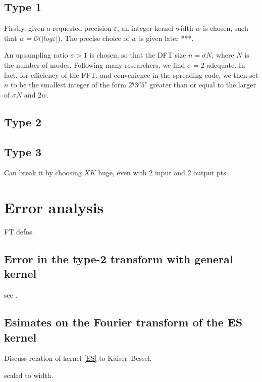 \documentclass[10pt]{article}
\newcommand{\eps}{\varepsilon}
\newcommand{\bigO}{{\mathcal O}}
\newcommand{\KB}{Kaiser--Bessel}
\newcommand{\sig}{\sigma}     %
\begin{document}
\subsection{Type 1}

Firstly, given a requested precision $\eps$, an integer kernel width $w$
is chosen, such that $w=\bigO(|log \eps|$). The precise choice of
$w$ is given later ***.

An upsampling ratio $\sig>1$ is chosen,
so that the DFT size $n = \sig N$, where $N$ is the number of modes.
Following many researchers, we find $\sig=2$ adequate.
In fact, for efficiency of the FFT, and convenience in the spreading
code, we then set $n$ to be the smallest
integer of the form $2^q3^p5^r$ greater than or equal to the
larger of $\sig N$ and $2w$.





\subsection{Type 2}


\subsection{Type 3}

Can break it by choosing $XK$ huge, even with 2 input and 2 output pts.


\section{Error analysis}

FT defns.

\subsection{Error in the type-2 transform with general kernel}

see \cite[Sec.~V.B]{fessler}.




\subsection{Esimates on the Fourier transform of the ES kernel}

Discuss relation of kernel \eqref{ES} to \KB.





scaled to width.
\end{document}
